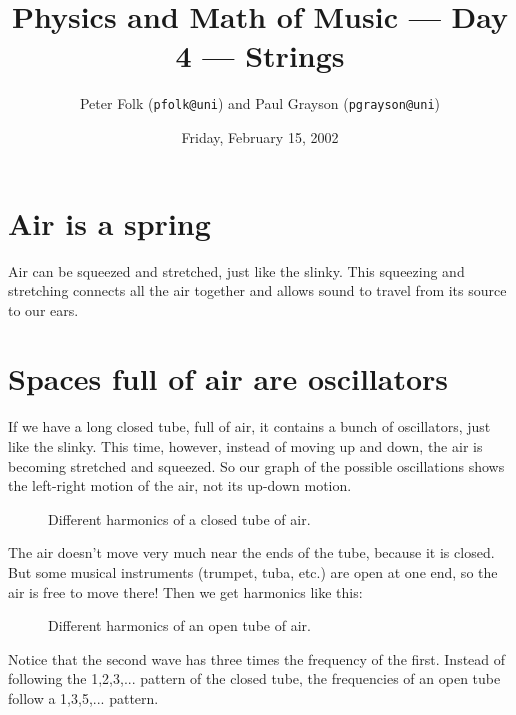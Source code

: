 \documentclass{article}
\begin{document}
\title{Physics and Math of Music --- Day 4 --- Strings}
\date{Friday, February 15, 2002}
\author{Peter Folk ({\tt pfolk@uni}) and Paul Grayson ({\tt pgrayson@uni})}
\maketitle

\section*{Air is a spring}

Air can be squeezed and stretched, just like the slinky.  This
squeezing and stretching connects all the air together and allows
sound to travel from its source to our ears.

\section*{Spaces full of air are oscillators}

If we have a long closed tube, full of air, it contains a bunch of
oscillators, just like the slinky.  This time, however, instead of
moving up and down, the air is becoming stretched and squeezed.  So
our graph of the possible oscillations shows the left-right motion of
the air, not its up-down motion.

\begin{figure}[h]
\begin{center}
	
	\caption{Different harmonics of a closed tube of air.}
\end{center}
\end{figure}

The air doesn't move very much near the ends of the tube, because it
is closed.  But some musical instruments (trumpet, tuba, etc.) are
open at one end, so the air is free to move there!  Then we get
harmonics like this:

\begin{figure}[h]
\begin{center}
	
	\caption{Different harmonics of an open tube of air.}
\end{center}
\end{figure}

Notice that the second wave has three times the frequency of the
first.  Instead of following the 1,2,3,{...} pattern of the closed
tube, the frequencies of an open tube follow a 1,3,5,{...} pattern.
\end{document}
